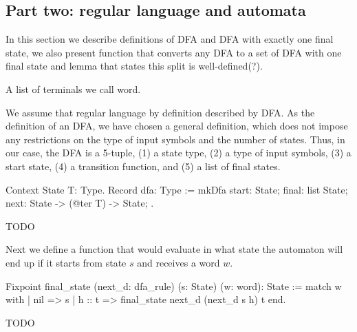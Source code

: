  
\subsection{Part two: regular language and automata}

In this section we describe definitions of DFA and DFA with exactly one final state, we also present function that converts any DFA to a set of DFA with one final state and lemma that states this split is well-defined(?).

A list of terminals we call word. 

We assume that regular language by definition described by DFA. As the definition of an DFA, we have chosen a general definition, which does not impose any restrictions on the type of input symbols and the number of states. Thus, in our case, the DFA is a 5-tuple, (1) a state type, (2) a type of input symbols, (3) a start state, (4) a transition function, and (5) a list of final states.

\begin{listing}[h]
	\begin{pyglist}[language=coq, numbers=none, numbersep=5pt]
  Context {State T: Type}.
  Record dfa: Type :=
    mkDfa {
      start: State;
      final: list State;
      next: State -> (@ter T) -> State;
    }.
	\end{pyglist}
	\caption{TODO}
	\label{lst:verbments1}
\end{listing}

Next we define a function that would evaluate in what state the automaton will end up if it starts from state $s$ and receives a word $w$. 

\begin{listing}[h]
	\begin{pyglist}[language=coq, numbers=none, numbersep=5pt]
  Fixpoint final_state (next_d: dfa_rule) (s: State) (w: word): State :=
    match w with
    | nil => s 
    | h :: t => final_state next_d (next_d s h) t 
    end.
	\end{pyglist}
	\caption{TODO}
	\label{lst:verbments1}
\end{listing}

